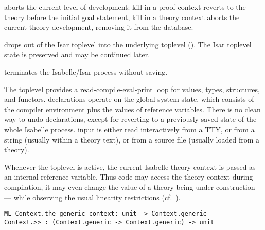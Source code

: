 \begin{isabellebody}
\begin{isamarkuptext}
\begin{description}
  \item {} aborts the current level of development:
  kill in a proof context reverts to the theory before the initial
  goal statement, kill in a theory context aborts the current theory
  development, removing it from the database.

  \item {} drops out of the Isar toplevel into the
  underlying {\ML} toplevel ().  The Isar
  toplevel state is preserved and may be continued later.

  \item {} terminates the Isabelle/Isar process without
  saving.

  \end{description}%
\end{isamarkuptext}%
\isamarkuptrue%
%
\isamarkuptrue%
%
\begin{isamarkuptext}%
The {\ML} toplevel provides a read-compile-eval-print loop for {\ML}
  values, types, structures, and functors.  {\ML} declarations operate
  on the global system state, which consists of the compiler
  environment plus the values of {\ML} reference variables.  There is
  no clean way to undo {\ML} declarations, except for reverting to a
  previously saved state of the whole Isabelle process.  {\ML} input
  is either read interactively from a TTY, or from a string (usually
  within a theory text), or from a source file (usually loaded from a
  theory).

  Whenever the {\ML} toplevel is active, the current Isabelle theory
  context is passed as an internal reference variable.  Thus {\ML}
  code may access the theory context during compilation, it may even
  change the value of a theory being under construction --- while
  observing the usual linearity restrictions
  (cf.~).%
\end{isamarkuptext}%
\isamarkuptrue%
%
\isadelimmlref
%
\endisadelimmlref
%
\isatagmlref
%
\begin{isamarkuptext}%
\begin{mldecls}
  \verb|ML_Context.the_generic_context: unit -> Context.generic| \\
  \verb|Context.>> : (Context.generic -> Context.generic) -> unit| \\
  \end{mldecls}


\end{isamarkuptext}
\end{isabellebody}
